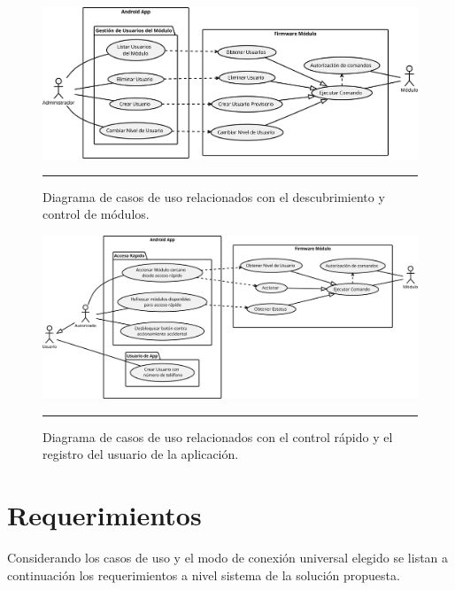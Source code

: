 \begin{figure}[htbp]
	\centering
	\includegraphics[width=\textwidth]{Figures/reque/USE_usuarios.png}
	\rule{35em}{1pt}
	\caption[Diagrama de Casos de Uso]{Diagrama de casos de uso relacionados con el descubrimiento y control de módulos.}
	\label{fig:uso_usuarios}
\end{figure}

\begin{figure}[htbp]
	\centering
	\includegraphics[width=\textwidth]{Figures/reque/USE_rapido.png}
	\rule{35em}{1pt}
	\caption[Diagrama de Casos de Uso]{Diagrama de casos de uso relacionados con el control rápido y el registro del usuario de la aplicación.}
	\label{fig:uso_rapido}
\end{figure}

\section{Requerimientos}
Considerando los casos de uso y el modo de conexión universal elegido se listan a continuación los requerimientos a nivel sistema de la solución propuesta.
